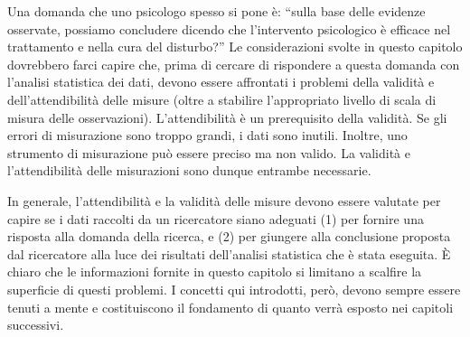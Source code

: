 Una domanda che uno psicologo spesso si pone è: ``sulla base delle evidenze  osservate, possiamo concludere dicendo che l'intervento psicologico è efficace nel trattamento e nella cura del disturbo?'' Le considerazioni svolte in questo capitolo dovrebbero farci capire che, prima di cercare di rispondere a questa domanda con l'analisi statistica dei dati, devono essere affrontati i problemi della validità e dell'attendibilità delle misure (oltre a stabilire l'appropriato livello di scala di misura delle osservazioni). L'attendibilità è un prerequisito della validità. Se gli errori di misurazione sono troppo grandi, i dati sono inutili.  Inoltre, uno strumento di misurazione può essere preciso ma non valido. La validità e l'attendibilità delle misurazioni sono dunque entrambe necessarie. 

In generale,  l'attendibilità e la validità delle misure devono essere valutate per capire se i dati raccolti da un ricercatore siano adeguati (1) per fornire una risposta alla domanda della ricerca, e (2) per giungere alla conclusione proposta dal ricercatore alla luce dei risultati dell'analisi statistica che è stata eseguita. È chiaro che le informazioni fornite in questo capitolo si limitano a scalfire la superficie di questi problemi. I concetti qui introdotti, però, devono sempre essere tenuti a mente e costituiscono il fondamento di quanto verrà esposto nei capitoli successivi.












